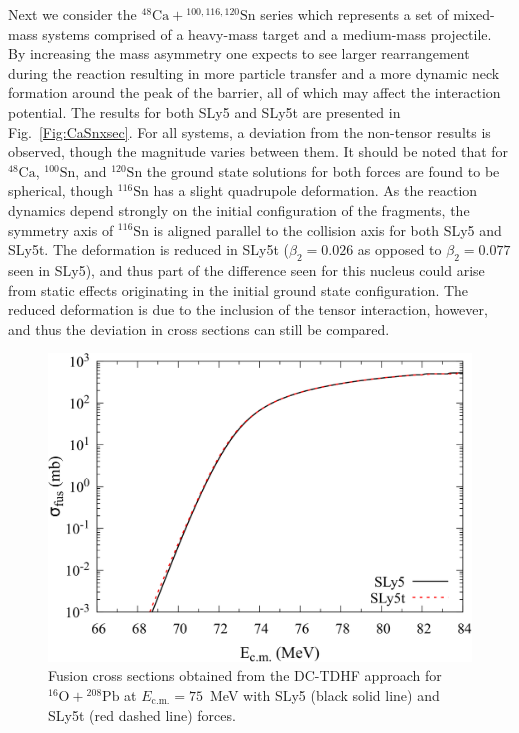 Next we consider the $^{48}\mathrm{Ca}+\mathrm{^{100,116,120}Sn}$ series which represents a set of mixed-mass systems comprised of a heavy-mass target and a medium-mass projectile.
By increasing the mass asymmetry one expects to see larger rearrangement during the reaction resulting in more particle transfer and a more dynamic neck formation around the peak of the barrier, all of which may affect the interaction potential.
The results for both SLy5 and SLy5t are presented in Fig.~\ref{Fig:CaSnxsec}.
For all systems, a deviation from the non-tensor results is observed, though the magnitude varies between them.
It should be noted that for $^{48}\mathrm{Ca}$, $^{100}\mathrm{Sn}$, and $^{120}\mathrm{Sn}$ the ground state solutions for both forces are found to be spherical, though $^{116}\mathrm{Sn}$ has a slight quadrupole deformation.
As the reaction dynamics depend strongly on the initial configuration of the fragments, the symmetry axis of $^{116}\mathrm{Sn}$ is aligned parallel to the collision axis for both SLy5 and SLy5t.
The deformation is reduced in SLy5t ($\beta_2=0.026$ as opposed to $\beta_2=0.077$ seen in SLy5), and thus part of the difference seen for this nucleus could arise from static effects originating in the initial ground state configuration.
The reduced deformation is due to the inclusion of the tensor interaction, however, and thus the deviation in cross sections can still be compared.


\begin{figure}
\includegraphics[width=\textwidth]{../Figures/TensorXsec/CrossSections_O16Pb208.pdf}
\caption{Fusion cross sections obtained from the DC-TDHF approach for $^{16}\mathrm{O}+\mathrm{^{208}Pb}$ at $E_{\mathrm{c.m.}}=75$~MeV with SLy5 (black solid line) and SLy5t (red dashed line) forces.
	\label{Fig:OPbxsec}}
\end{figure}

